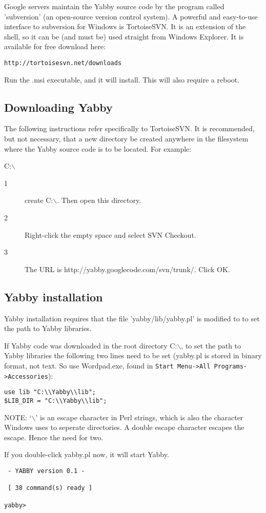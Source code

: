 Google servers maintain the Yabby source code by the program called
'subversion' (an open-source version control system).  A powerful and
easy-to-use interface to subversion for Windows is TortoiseSVN. It is
an extension of the shell, so it can be (and must be) used straight
from Windows Explorer. It is available for free download here:

\begin{verbatim}
http://tortoisesvn.net/downloads
\end{verbatim}

Run the .msi executable, and it will install. This will also require
a reboot.

\subsection{Downloading Yabby}

The following instructions refer specifically to TortoiseSVN. It is
recommended, but not necessary, that a new directory be created anywhere in
the filesystem where the Yabby source code is to be located. For example:

C:{$\backslash$}
\begin{description}
  \item[1] create C:{$\backslash$}. Then open this directory.
  
  \item[2] Right-click the empty space and select SVN Checkout.
  
  \item[3] The URL is http://yabby.googlecode.com/svn/trunk/. Click OK.
\end{description}

\subsection{Yabby installation}

Yabby installation requires that the file 'yabby/lib/yabby.pl' is modified to
to set the path to Yabby libraries.

If Yabby code was downloaded in the root directory C:$\backslash$, to set
the path to Yabby libraries the following two lines need to be set (yabby.pl
is stored in binary format, not text. So use Wordpad.exe, found in
{\tt Start Menu->All Programs->Accessories}):
\begin{verbatim}
use lib "C:\\Yabby\\lib";
$LIB_DIR = "C:\\Yabby\\lib";
\end{verbatim}
NOTE: `{$\backslash$}' is an escape character in Perl strings, which is
also the character Windows uses to seperate directories. A double escape
character escapes the escape. Hence the need for two.

If you double-click yabby.pl now, it will start Yabby.
\begin{verbatim}
 - YABBY version 0.1 - 

 [ 38 command(s) ready ]

yabby>
\end{verbatim}

